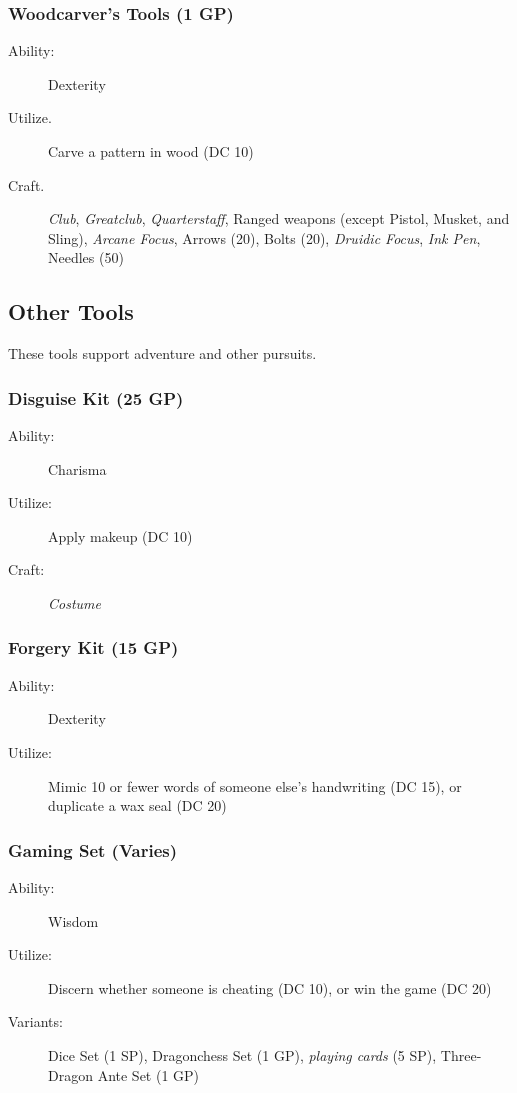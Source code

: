 \documentclass[10pt,a4paper,twoside,bg=print,twocolumn,openany,nodeprecatedcode]{dndbook}
\begin{document}
\subsubsection{Woodcarver's Tools (1 GP)}

\begin{description}
\item[Ability:]
Dexterity
\item[Utilize.]
Carve a pattern in wood (DC 10)
\item[Craft.]
\textit{Club}, \textit{Greatclub}, \textit{Quarterstaff}, Ranged weapons (except Pistol, Musket, and Sling), \textit{Arcane Focus}, Arrows (20), Bolts (20), \textit{Druidic Focus}, \textit{Ink Pen}, Needles (50)
\end{description}

\subsection{Other Tools}
These tools support adventure and other pursuits.

\subsubsection{Disguise Kit (25 GP)}

\begin{description}
\item[Ability:]
Charisma
\item[Utilize:]
Apply makeup (DC 10)
\item[Craft:]
\textit{Costume}
\end{description}

\subsubsection{Forgery Kit (15 GP)}

\begin{description}
\item[Ability:]
Dexterity
\item[Utilize:]
Mimic 10 or fewer words of someone else's handwriting (DC 15), or duplicate a wax seal (DC 20)
\end{description}

\subsubsection{Gaming Set (Varies)}

\begin{description}
\item[Ability:]
Wisdom
\item[Utilize:]
Discern whether someone is cheating (DC 10), or win the game (DC 20)
\item[Variants:]
Dice Set (1 SP), Dragonchess Set (1 GP), \textit{playing cards} (5 SP), Three-Dragon Ante Set (1 GP)
\end{description}
\end{document}
